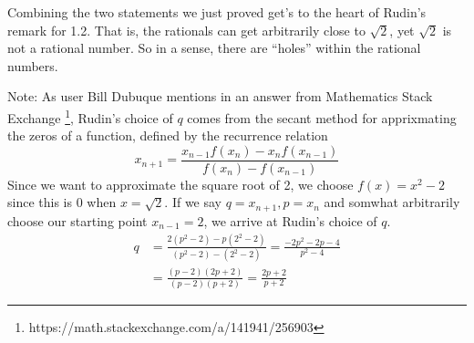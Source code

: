 \documentclass{article}
\begin{document}
Combining the two statements we just proved get's to the heart of Rudin's remark
for 1.2. That is, the rationals can get arbitrarily close to $\sqrt{2}$, yet
$\sqrt{2}$ is not a rational number. So in a sense, there are \enquote{holes}
within the rational numbers.

Note: As user Bill Dubuque mentions in an answer from Mathematics Stack
Exchange \footnote{https://math.stackexchange.com/a/141941/256903}, Rudin's
choice of $q$ comes from the secant method for apprixmating the zeros of a
function, defined by the recurrence relation
\begin{equation*}
x_{n+1} = \frac{x_{n-1}f(x_n)-x_nf(x_{n-1})}{f(x_n)-f(x_{n-1})}
\end{equation*}
Since we want to approximate the square root of 2, we choose $f(x) = x^2-2$
since this is 0 when $x = \sqrt{2}$. If we say $q = x_{n+1}, p = x_n$ and
somwhat arbitrarily choose our starting point $x_{n-1} = 2$, we arrive at
Rudin's choice of $q$.
\begin{align*}
q &= \frac{2(p^2-2) - p(2^2-2)}{(p^2-2)-(2^2-2)}
   = \frac{-2p^2 - 2p - 4}{p^2-4}\\
  &= \frac{(p-2)(2p+2)}{(p-2)(p+2)}
   = \frac{2p+2}{p+2}
\end{align*}
\end{document}
